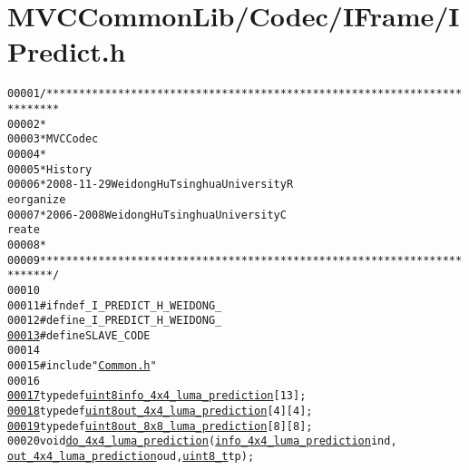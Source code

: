 \hypertarget{_i_predict_8h_source}{
\section{MVCCommonLib/Codec/IFrame/IPredict.h}
}


\begin{footnotesize}\begin{alltt}
00001 \textcolor{comment}{/************************************************************************}
00002 \textcolor{comment}{ *}
00003 \textcolor{comment}{ * MVC Codec}
00004 \textcolor{comment}{ * }
00005 \textcolor{comment}{ * History}
00006 \textcolor{comment}{ * 2008-11-29           Weidong Hu              Tsinghua University             R
      eorganize}
00007 \textcolor{comment}{ * 2006-2008            Weidong Hu              Tsinghua University             C
      reate}
00008 \textcolor{comment}{ * }
00009 \textcolor{comment}{ ************************************************************************/}
00010 
00011 \textcolor{preprocessor}{#ifndef \_I\_PREDICT\_H\_WEIDONG\_}
00012 \textcolor{preprocessor}{}\textcolor{preprocessor}{#define \_I\_PREDICT\_H\_WEIDONG\_}
\hypertarget{_i_predict_8h_source_l00013}{}\hyperlink{_i_predict_8h_a995f6a4907273b8d56b6543ab1a57d17}{00013} \textcolor{preprocessor}{}\textcolor{preprocessor}{#define SLAVE\_CODE}
00014 \textcolor{preprocessor}{}
00015 \textcolor{preprocessor}{#include "\hyperlink{_common_8h}{Common.h}"}
00016 
\hypertarget{_i_predict_8h_source_l00017}{}\hyperlink{_i_predict_8h_ac6170ef868fb47b246dc17d9767c6b7e}{00017} \textcolor{keyword}{typedef} \hyperlink{_types_8h_adde6aaee8457bee49c2a92621fe22b79}{uint8} \hyperlink{_i_predict_8h_ac6170ef868fb47b246dc17d9767c6b7e}{info_4x4_luma_prediction}[13];
\hypertarget{_i_predict_8h_source_l00018}{}\hyperlink{_i_predict_8h_ad13e421d5c8f05855f5e73faad950492}{00018} \textcolor{keyword}{typedef} \hyperlink{_types_8h_adde6aaee8457bee49c2a92621fe22b79}{uint8} \hyperlink{_i_predict_8h_ad13e421d5c8f05855f5e73faad950492}{out_4x4_luma_prediction}[4][4];
\hypertarget{_i_predict_8h_source_l00019}{}\hyperlink{_i_predict_8h_a8fffa1f1faa3bee7fe022a135a996676}{00019} \textcolor{keyword}{typedef} \hyperlink{_types_8h_adde6aaee8457bee49c2a92621fe22b79}{uint8} \hyperlink{_i_predict_8h_a8fffa1f1faa3bee7fe022a135a996676}{out_8x8_luma_prediction}[8][8];
00020 \textcolor{keywordtype}{void} \hyperlink{_i_predict_8cpp_acc4ad7a1035118020f7e66044e323e45}{do_4x4_luma_prediction}(\hyperlink{_i_predict_8h_ac6170ef868fb47b246dc17d9767c6b7e}{info_4x4_luma_prediction} ind, 
      \hyperlink{_i_predict_8h_ad13e421d5c8f05855f5e73faad950492}{out_4x4_luma_prediction} oud, \hyperlink{_types_8h_a363e4d606232036a6b89060813c45489}{uint8_t} tp);

\end{alltt}
\end{footnotesize}
